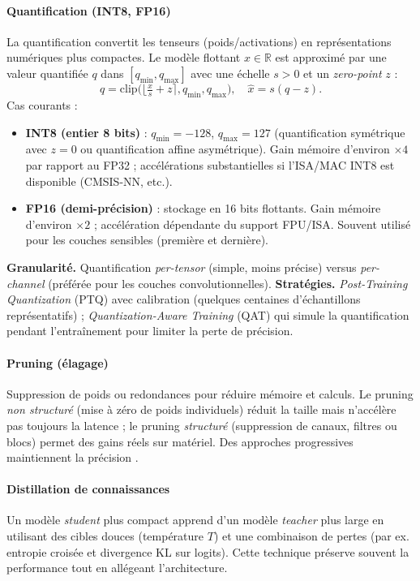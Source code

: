 \paragraph{Quantification (INT8, FP16)}\label{subsec:quant}  
La quantification convertit les tenseurs (poids/activations) en représentations numériques plus compactes. Le modèle flottant \( x \in \mathbb{R} \) est approximé par une valeur quantifiée \( q \) dans \([q_{\min}, q_{\max}]\) avec une échelle \( s > 0 \) et un \emph{zero-point} \( z \) :
\begin{equation}
    \label{eq:affine_quant}
    q = \mathrm{clip}\Big(\big\lfloor \tfrac{x}{s} + z \big\rceil, q_{\min}, q_{\max}\Big), \quad \hat{x} = s(q - z).
\end{equation}
Cas courants :
\begin{itemize}
    \item \textbf{INT8 (entier 8 bits)} : \(q_{\min} = -128\), \(q_{\max} = 127\) (quantification symétrique avec \(z=0\) ou quantification affine asymétrique). Gain mémoire d’environ \(\times 4\) par rapport au FP32 ; accélérations substantielles si l’ISA/MAC INT8 est disponible (CMSIS-NN, etc.).
    \item \textbf{FP16 (demi-précision)} : stockage en 16 bits flottants. Gain mémoire d’environ \(\times 2\) ; accélération dépendante du support FPU/ISA. Souvent utilisé pour les couches sensibles (première et dernière).
\end{itemize}  
\textbf{Granularité.} Quantification \emph{per-tensor} (simple, moins précise) versus \emph{per-channel} (préférée pour les couches convolutionnelles).  
\textbf{Stratégies.} \emph{Post-Training Quantization} (PTQ) avec calibration (quelques centaines d’échantillons représentatifs) ; \emph{Quantization-Aware Training} (QAT) qui simule la quantification pendant l’entraînement pour limiter la perte de précision.

\paragraph{Pruning (élagage)}  
Suppression de poids ou redondances pour réduire mémoire et calculs. Le pruning \emph{non structuré} (mise à zéro de poids individuels) réduit la taille mais n’accélère pas toujours la latence ; le pruning \emph{structuré} (suppression de canaux, filtres ou blocs) permet des gains réels sur matériel. Des approches progressives maintiennent la précision \cite{han2016deep}.

\paragraph{Distillation de connaissances}  
Un modèle \emph{student} plus compact apprend d’un modèle \emph{teacher} plus large en utilisant des cibles douces (température \(T\)) et une combinaison de pertes (par ex. entropie croisée et divergence KL sur logits). Cette technique préserve souvent la performance tout en allégeant l’architecture.

